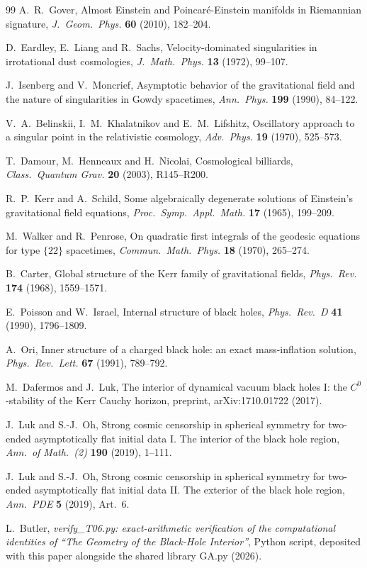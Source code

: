 \documentclass[11pt]{article}
\theoremstyle{definition}
\begin{document}
\begin{thebibliography}{99}
A.~R.~Gover,
Almost Einstein and Poincar\'e-Einstein manifolds in Riemannian signature,
\emph{J.\ Geom.\ Phys.} \textbf{60} (2010), 182--204.

D.~Eardley, E.~Liang and R.~Sachs,
Velocity-dominated singularities in irrotational dust cosmologies,
\emph{J.\ Math.\ Phys.} \textbf{13} (1972), 99--107.

J.~Isenberg and V.~Moncrief,
Asymptotic behavior of the gravitational field and the nature of singularities in Gowdy spacetimes,
\emph{Ann.\ Phys.} \textbf{199} (1990), 84--122.

V.~A.~Belinskii, I.~M.~Khalatnikov and E.~M.~Lifshitz,
Oscillatory approach to a singular point in the relativistic cosmology,
\emph{Adv.\ Phys.} \textbf{19} (1970), 525--573.

T.~Damour, M.~Henneaux and H.~Nicolai,
Cosmological billiards,
\emph{Class.\ Quantum Grav.} \textbf{20} (2003), R145--R200.

R.~P.~Kerr and A.~Schild,
Some algebraically degenerate solutions of Einstein's gravitational field equations,
\emph{Proc.\ Symp.\ Appl.\ Math.} \textbf{17} (1965), 199--209.

M.~Walker and R.~Penrose,
On quadratic first integrals of the geodesic equations for type $\{22\}$ spacetimes,
\emph{Commun.\ Math.\ Phys.} \textbf{18} (1970), 265--274.

B.~Carter,
Global structure of the Kerr family of gravitational fields,
\emph{Phys.\ Rev.} \textbf{174} (1968), 1559--1571.

E.~Poisson and W.~Israel,
Internal structure of black holes,
\emph{Phys.\ Rev.\ D} \textbf{41} (1990), 1796--1809.

A.~Ori,
Inner structure of a charged black hole: an exact mass-inflation solution,
\emph{Phys.\ Rev.\ Lett.} \textbf{67} (1991), 789--792.

M.~Dafermos and J.~Luk,
The interior of dynamical vacuum black holes I: the $C^0$-stability of the Kerr Cauchy horizon,
preprint, arXiv:1710.01722 (2017).

J.~Luk and S.-J.~Oh,
Strong cosmic censorship in spherical symmetry for two-ended asymptotically flat initial data I. The interior of the black hole region,
\emph{Ann.\ of Math.\ (2)} \textbf{190} (2019), 1--111.

J.~Luk and S.-J.~Oh,
Strong cosmic censorship in spherical symmetry for two-ended asymptotically flat initial data II. The exterior of the black hole region,
\emph{Ann.\ PDE} \textbf{5} (2019), Art.\ 6.

L.~Butler,
\emph{verify\_T06.py: exact-arithmetic verification of the computational identities of ``The Geometry of the Black-Hole Interior''},
Python script, deposited with this paper alongside the shared library GA.py (2026).

\end{thebibliography}
\end{document}
